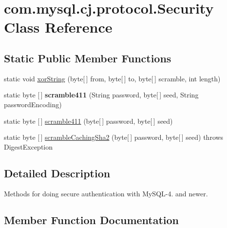 \hypertarget{classcom_1_1mysql_1_1cj_1_1protocol_1_1_security}{}\section{com.\+mysql.\+cj.\+protocol.\+Security Class Reference}
\label{classcom_1_1mysql_1_1cj_1_1protocol_1_1_security}
\subsection*{Static Public Member Functions}
\begin{DoxyCompactItemize}
\item 
static void \mbox{\hyperlink{classcom_1_1mysql_1_1cj_1_1protocol_1_1_security_a6529697fb27ef62f6a21cb347f5e4c99}{xor\+String}} (byte\mbox{[}$\,$\mbox{]} from, byte\mbox{[}$\,$\mbox{]} to, byte\mbox{[}$\,$\mbox{]} scramble, int length)
\item 
\mbox{\label{classcom_1_1mysql_1_1cj_1_1protocol_1_1_security_abe3782ad69fe2237705cbf44e28ab779}} 
static byte \mbox{[}$\,$\mbox{]} {\bfseries scramble411} (String password, byte\mbox{[}$\,$\mbox{]} seed, String password\+Encoding)
\item 
static byte \mbox{[}$\,$\mbox{]} \mbox{\hyperlink{classcom_1_1mysql_1_1cj_1_1protocol_1_1_security_a1459b1e2d3828790e1d8982e65e68b34}{scramble411}} (byte\mbox{[}$\,$\mbox{]} password, byte\mbox{[}$\,$\mbox{]} seed)
\item 
static byte \mbox{[}$\,$\mbox{]} \mbox{\hyperlink{classcom_1_1mysql_1_1cj_1_1protocol_1_1_security_a0f3d13ee7c5799791fe54f3857581bfd}{scramble\+Caching\+Sha2}} (byte\mbox{[}$\,$\mbox{]} password, byte\mbox{[}$\,$\mbox{]} seed)  throws Digest\+Exception 
\end{DoxyCompactItemize}


\subsection{Detailed Description}
Methods for doing secure authentication with My\+S\+Q\+L-\/4. and newer. 

\subsection{Member Function Documentation}
\mbox{\label{classcom_1_1mysql_1_1cj_1_1protocol_1_1_security_a1459b1e2d3828790e1d8982e65e68b34}} 
